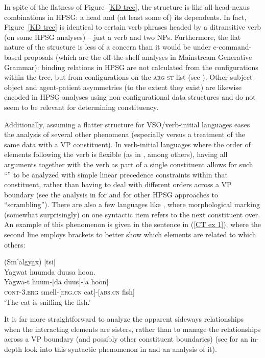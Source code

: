 \documentclass[output=paper
	        ,collection
	        ,collectionchapter
 	        ,biblatex
                ,babelshorthands
                ,newtxmath
                ,draftmode
                ,colorlinks, citecolor=brown
]{langscibook}
\begin{document}
In spite of the flatness of Figure~\ref{KD tree}, the structure is like all head-nexus combinations in HPSG: a head and (at least some of) its dependents. In fact, Figure~\ref{KD tree} is identical to certain verb phrases headed by a ditransitive verb (on some HPSG analyses) -- just a verb and two NPs. Furthermore, the flat nature of the structure is less of a concern than it would be under c-command-based proposals (which are the off-the-shelf analyses in Mainstream Generative Grammar): binding relations in HPSG are not calculated from the configurations within the tree, but from configurations on the \textsc{arg-st} list (see ). Other subject-object and agent-patient asymmetries (to the extent they exist) are likewise encoded in HPSG analyses using non-configurational data structures and do not seem to be relevant for determining constituency.

Additionally, assuming a flatter structure for VSO/verb-initial languages eases the analysis of several other phenomena (especially versus a treatment of the same data with a VP constituent). In verb-initial languages where the order of elements following the verb is flexible (as in , among others), having all arguments together with the verb as part of a single constituent allows for such ``'' to be analyzed with simple linear precedence constraints within that constituent, rather than having to deal with different orders across a VP boundary (see the analysis in \citealt[Chapter 3]{ball08thesis} for  and  for other HPSG approaches to ``scrambling''). There are also a few languages like , where morphological marking (somewhat surprisingly) on one syntactic item refers to the next constituent over. An example of this phenomenon is given in the  sentence in (\ref{CT ex 1}), where the second line employs brackets to better show which elements are related to which others:        
%
\begin{samepage}
\begin{exe}
\ex\label{CT ex 1}  (Sm'algy\underline{a}x) [tsi] \citep[32]{mulder94} \\
 Yagwat huumda duusa hoon. \\
\gll Yagwa-t huum-[da duus]-[a hoon] \\
 \textsc{cont}-\textsc{3.erg} smell-[\textsc{erg.cn} cat]-[\textsc{abs.cn} fish] \\
\trans `The cat is sniffing the fish.' 
\end{exe}
\end{samepage}
%
It is far more straightforward to analyze the apparent sideways relationships when the interacting elements are sisters, rather than to manage the relationships across a VP boundary (and possibly other constituent boundaries) (see \citealt{ball11} for an in-depth look into this syntactic phenomenon in  and an analysis of it).  
\end{document}
